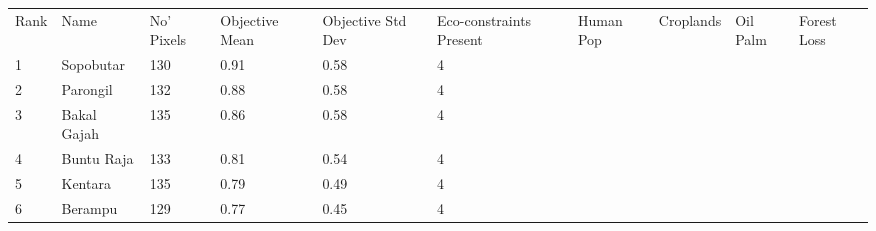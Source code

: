 \begin{table}[ht]
\centering
\begingroup\fontsize{9pt}{10pt}\selectfont
\begin{tabular}{C{0.05\textwidth}C{0.15\textwidth}C{0.08\textwidth}C{0.08\textwidth}C{0.08\textwidth}C{0.08\textwidth}C{0.08\textwidth}C{0.08\textwidth}C{0.08\textwidth}C{0.08\textwidth}}
 Rank & Name & No' Pixels & Objective Mean & Objective Std Dev & Eco-constraints  Present & Human Pop & Croplands & Oil Palm & Forest Loss \\ 
 {1} & Sopobutar & 130 & \textcolor[HTML]{FFFFFF}{0.91} & \textcolor[HTML]{FFFFFF}{0.58} & \textcolor[HTML]{000000}{4} &  &  &  &  \\ 
  {2} & Parongil & 132 & \textcolor[HTML]{FFFFFF}{0.88} & \textcolor[HTML]{FFFFFF}{0.58} & \textcolor[HTML]{000000}{4} &  &  &  &  \\ 
  {3} & Bakal Gajah & 135 & \textcolor[HTML]{FFFFFF}{0.86} & \textcolor[HTML]{FFFFFF}{0.58} & \textcolor[HTML]{000000}{4} &  &  &  &  \\ 
  {4} & Buntu Raja & 133 & \textcolor[HTML]{FFFFFF}{0.81} & \textcolor[HTML]{FFFFFF}{0.54} & \textcolor[HTML]{000000}{4} &  &  &  &  \\ 
  {5} & Kentara & 135 & \textcolor[HTML]{FFFFFF}{0.79} & \textcolor[HTML]{000000}{0.49} & \textcolor[HTML]{000000}{4} &  &  &  &  \\ 
  {6} & Berampu & 129 & \textcolor[HTML]{000000}{0.77} & \textcolor[HTML]{000000}{0.45} & \textcolor[HTML]{000000}{4} &  &  &  &  \\ 

\end{tabular}
\end{table}
